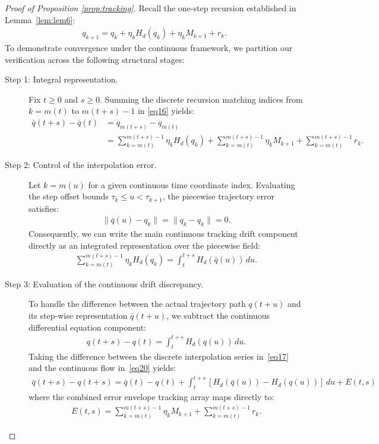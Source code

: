 \documentclass[11pt,a4paper]{article}
\theoremstyle{definition}
\begin{document}
\begin{proof}[Proof of Proposition \ref{prop:tracking}]
Recall the one-step recursion established in Lemma~\ref{lem:lem6}:
\begin{align}
q_{k+1}= q_k + \eta_k H_d(q_k) + \eta_k M_{k+1} + r_k \label{eq16}.
\end{align}
To demonstrate convergence under the continuous framework, we partition our verification across the following structural stages:

\begin{description}
    \item[Step 1: Integral representation.] Fix $t \ge 0$ and $s \ge 0$. Summing the discrete recursion matching indices from $k = m(t)$ to $m(t+s)-1$ in \eqref{eq16} yields:
    \begin{align}
  \bar{q}(t+s)-\bar{q}(t)&=  q_{m(t+s)} - q_{m(t)} \nonumber \\
  &= \sum_{k=m(t)}^{m(t+s)-1} \eta_k H_d(q_k) + \sum_{k=m(t)}^{m(t+s)-1} \eta_k M_{k+1} + \sum_{k=m(t)}^{m(t+s)-1} r_k \label{eq17}.
    \end{align}
    
    \item[Step 2: Control of the interpolation error.] Let $k = m(u)$ for a given continuous time coordinate index. Evaluating the step offset bounds $\tau_k \le u < \tau_{k+1}$, the piecewise trajectory error satisfies:
    \begin{align}
    \| \bar{q}(u) - q_k \| = \| q_k - q_k \| = 0.
    \end{align}
    Consequently, we can write the main continuous tracking drift component directly as an integrated representation over the piecewise field:
    \begin{align}
    \sum_{k=m(t)}^{m(t+s)-1} \eta_k H_d(q_k) = \int_{t}^{t+s} H_d(\bar{q}(u)) \, du.
    \end{align}

    \item[Step 3: Evaluation of the continuous drift discrepancy.] To handle the difference between the actual trajectory path $q(t+u)$ and its step-wise representation $\bar{q}(t+u)$, we subtract the continuous differential equation component:
    \begin{align}
    q(t+s) - q(t) = \int_{t}^{t+s} H_d(q(u)) \, du \label{eq20}.
    \end{align}
    Taking the difference between the discrete interpolation series in~\eqref{eq17} and the continuous flow in~\eqref{eq20}  yields:
    \begin{align}
    \bar{q}(t+s) - q(t+s) = \bar{q}(t) - q(t) + \int_{t}^{t+s} \left[ H_d(\bar{q}(u)) - H_d(q(u)) \right] \, du + E(t,s)
    \end{align}
    where the combined error envelope tracking array maps directly to:
    \begin{align}
    E(t,s) = \sum_{k=m(t)}^{m(t+s)-1} \eta_k M_{k+1} + \sum_{k=m(t)}^{m(t+s)-1} r_k.
    \end{align}


\end{description}
\end{proof}
\end{document}
